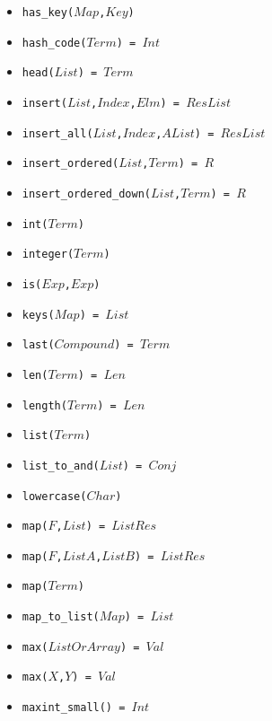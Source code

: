 \documentclass[10pt]{article}
\begin{document}
\begin{multicols}{2}
\begin{scriptsize}
\begin{itemize}
    \item \texttt{has\_key($Map$,$Key$)} 
    \item \texttt{hash\_code($Term$) = $Int$} 
    \item \texttt{head($List$) = $Term$} 
    \item \texttt{insert($List$,$Index$,$Elm$) = $ResList$} 
    \item \texttt{insert\_all($List$,$Index$,$AList$) = $ResList$} 
    \item \texttt{insert\_ordered($List$,$Term$) = $R$} 
    \item \texttt{insert\_ordered\_down($List$,$Term$) = $R$} 
    \item \texttt{int($Term$)} 
    \item \texttt{integer($Term$)} 
    \item \texttt{is($Exp$,$Exp$)} 
    \item \texttt{keys($Map$) = $List$} 
    \item \texttt{last($Compound$) = $Term$} 
    \item \texttt{len($Term$) = $Len$} 
    \item \texttt{length($Term$) = $Len$} 
    \item \texttt{list($Term$)} 
    \item \texttt{list\_to\_and($List$) = $Conj$}
    \item \texttt{lowercase($Char$)} 
    \item \texttt{map($F$,$List$) = $ListRes$} 
    \item \texttt{map($F$,$ListA$,$ListB$) = $ListRes$} 
    \item \texttt{map($Term$)} 
    \item \texttt{map\_to\_list($Map$) = $List$} 
    \item \texttt{max($ListOrArray$) = $Val$} 
    \item \texttt{max($X$,$Y$) = $Val$} 
    \item \texttt{maxint\_small() = $Int$}

\end{itemize}
\end{scriptsize}
\end{multicols}
\end{document}
